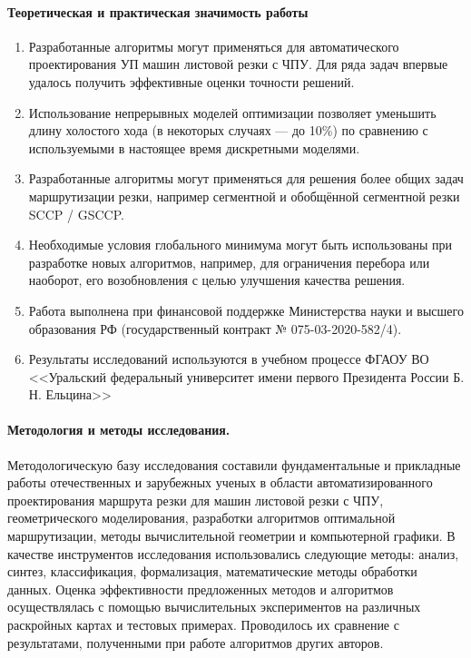 \paragraph*{Теоретическая и практическая значимость работы}

\begin{enumerate}
    \item
    Разработанные алгоритмы могут применяться для
    автоматического проектирования УП машин листовой резки с ЧПУ.
    Для ряда задач впервые удалось получить эффективные оценки точности решений.
    \item
    Использование непрерывных моделей оптимизации
    позволяет уменьшить длину
    холостого хода
    (в некоторых случаях --- до 10\%)
    по сравнению с используемыми
    в настоящее время дискретными моделями.
    \item
    Разработанные алгоритмы могут применяться для решения
    более общих задач
    маршрутизации резки,
    например сегментной и обобщённой сегментной резки SCCP / GSCCP.
    \item
    Необходимые условия глобального минимума могут быть использованы при разработке новых
    алгоритмов, например, для ограничения перебора или наоборот,
    его возобновления с целью улучшения качества решения.
    \item
    Работа выполнена при финансовой поддержке
    Министерства науки и высшего образования РФ
    (государственный контракт № 075-03-2020-582/4).
    \item
    Результаты исследований используются в учебном процессе
    ФГАОУ ВО <<Уральский федеральный университет имени первого Президента России Б. Н. Ельцина>>
\end{enumerate}

\paragraph*{Методология и методы исследования.}

Методологическую базу исследования составили
фундаментальные и прикладные работы отечественных и зарубежных ученых
в области автоматизированного проектирования маршрута резки для машин листовой резки с ЧПУ,
геометрического моделирования,
разработки алгоритмов оптимальной маршрутизации,
методы вычислительной геометрии и компьютерной графики.
В качестве инструментов исследования использовались следующие методы:
анализ, синтез, классификация, формализация, математические методы обработки данных.
Оценка эффективности предложенных
методов и алгоритмов осуществлялась с помощью вычислительных экспериментов
на различных раскройных картах и тестовых примерах.
Проводилось их сравнение с результатами,
полученными при работе алгоритмов
других авторов.

